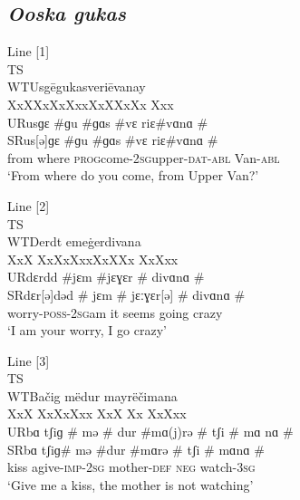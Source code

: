 \documentclass[output=paper,colorlinks,citecolor=brown]{langscibook}
\begin{document}
{\sloppy\printbibliography[heading=subbibliography,notkeyword=this]}

\begin{paperappendix}
\section*{\textit{Ooska gukas}} \label{baronian:append}

Line [1]\\
TS\tab  {}\tab \\
WT\tab  Usgē\tab  \tab    gu\tab  kas\tab   \tab veriē\tab     \tab  \tab vanay\\
\tab \tab XxX\tab    Xx\tab  Xx\tab  Xxx\tab   \tab  XxX\tab    Xx\tab \tab  Xx \tab Xxx \\
UR\tab  us\tab     ɡɛ \#\tab  ɡu \#\tab  ɡɑs \#\tab   \tab  vɛ ri\tab    ɛ\#\tab  \tab vɑ\tab  nɑ \#\\
SR\tab  us[ə]\tab     ɡɛ \#\tab  ɡu \#\tab  ɡɑs \#\tab  \tab   vɛ ri\tab    ɛ\#\tab  \tab vɑ\tab  nɑ \#\\
\tab \tab from where \tab  \textsc{prog}\tab  come-2\textsc{sg}\tab  upper-\textsc{dat-abl}  \tab Van-\textsc{abl}\\
‘From where do you come, from Upper Van?'\medskip

\noindent Line [2]\\
TS\tab  {}\\
WT\tab  Derdt  \tab \tab  \tab   em\tab  e\.ger\tab \tab \tab        divana\\
\tab \tab XxX \tab   Xx\tab \tab  Xx\tab  Xxx\tab    XxX\tab  \tab   Xx \tab   Xx\tab  Xxx\\
UR\tab  dɛr\tab    dd \#\tab \tab  jɛm \#\tab  jɛ\tab    ɣɛr \# \tab \tab  di\tab  vɑ\tab  nɑ \#\\
SR\tab  dɛr[ə]\tab    dəd \# \tab \tab jɛm \# \tab jɛː\tab    ɣɛr[ə] \# \tab di\tab  vɑ\tab  nɑ \#\\
\tab \tab worry-\textsc{poss-2sg}\tab  am \tab it seems \tab \tab     going crazy\\
‘I am your worry, I go crazy’\medskip

\newpage
\noindent Line [3]\\
TS\tab  {}  \\ 
WT\tab  Bačig \tab \tab     më\tab  dur \tab \tab  mayrë\tab \tab   či\tab  mana\\
\tab \tab XxX \tab   Xx\tab  Xx\tab  Xxx \tab \tab   XxX \tab \tab   Xx \tab Xx\tab  Xxx\\
UR\tab  bɑ tʃiɡ \tab   \# \tab mə \# \tab dur \#\tab  \tab  mɑ(j)rə \# \tab tʃi \# \tab mɑ \tab nɑ \#\\
SR\tab  bɑ tʃiɡ\tab    [ə] \# \tab mə \#\tab  dur \#\tab  \tab  mɑrə \# \tab tʃi \# \tab mɑ\tab  nɑ \#\\
\tab \tab kiss \tab \tab      a\tab  give-\textsc{imp-2sg} \tab mother-\textsc{def} \tab \textsc{neg} \tab watch-3\textsc{sg}\\
‘Give me a kiss, the mother is not watching’\medskip


\end{paperappendix}
\end{document}
